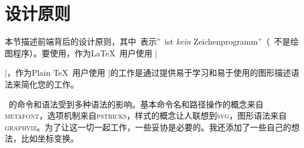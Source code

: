 %
%
%


\section{设计原则}


本节描述\tikzname 前端背后的设计原则，其中\tikzname\ 表示''\tikzname\ ist \emph{kein} Zeichenprogramm''（\tikzname\ 不是绘图程序）。要使用\tikzname ，作为\LaTeX\ 用户使用 |\usepackage{tikz}|，作为Plain \TeX\ 用户使用 |\tikzname 的工作是通过提供易于学习和易于使用的图形描述语法来简化您的工作。


\tikzname\ 的命令和语法受到多种语法的影响。基本命令名和路径操作的概念来自\textsc{metafont}，选项机制来自\textsc{pstricks}，样式的概念让人联想到\textsc{svg}，图形语法来自\textsc{graphviz}。为了让这一切一起工作，一些妥协是必要的。我还添加了一些自己的想法，比如坐标变换。


